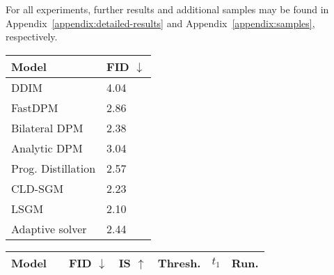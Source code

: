 \documentclass{article}
\begin{document}
For all experiments, further results and additional samples may be found in Appendix~\ref{appendix:detailed-results} and Appendix~\ref{appendix:samples}, respectively.



\begin{table}[t!] 
\begin{minipage}[b]{.32\linewidth}
    \centering
    {\small
    \begin{tabularx}{\textwidth}{lY}
    \toprule
    Model                           & FID $\downarrow$   \\ \midrule
    DDIM  \cite{song2020denoising}  & 4.04 \\ 
    FastDPM \cite{kong2021fast} & 2.86  \\ 
    Bilateral DPM \cite{lam2021bilateral} & 2.38  \\ Analytic DPM \cite{bao2022analytic} & 3.04  \\ 
    Prog. Distillation \cite{salimans2021progressive} & 2.57  \\
    CLD-SGM \cite{dockhorn2021score} & 2.23  \\
    LSGM \cite{vahdat2021score} & 2.10 \\
    Adaptive solver \cite{jolicoeur2021gotta} & 2.44  \\
     \bottomrule
    \end{tabularx}   
    }
\end{minipage} \hspace{0.1cm}
\begin{minipage}[b]{.67\linewidth}
    \centering
    {\small
    \begin{tabularx}{\textwidth}{llYYYYY}
    \toprule
    Model  && FID $\downarrow$   & IS $\uparrow$ & Thresh.   & $t_1$ & Run. \\ \midrule
    

\end{tabularx}}
\end{minipage}
\end{table}
\end{document}
